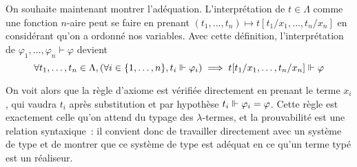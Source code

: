 \documentclass{article}
\begin{document}
On souhaite maintenant montrer l'adéquation. L'interprétation de $t\in \Lambda$ comme une fonction $n$-aire peut se faire en prenant $(t_1,\ldots,t_n) \mapsto t[t_1/x_1,\ldots,t_n/x_n]$ en considérant qu'on a ordonné nos variables. Avec cette définition, l'interprétation de $\varphi_1,\ldots,\varphi_n\vdash \varphi$ devient
\[\forall t_1,\ldots,t_n \in \Lambda, (\forall i \in \{1,\ldots,n\}, t_i \Vdash \varphi_i)\implies t[t_1/x_1,\ldots,t_n/x_n]\Vdash\varphi\]

On voit alors que la règle d'axiome est vérifiée directement en prenant le terme $x_i$, qui vaudra $t_i$ après substitution et par hypothèse $t_i\Vdash \varphi_i = \varphi$. Cette règle est exactement celle qu'on attend du typage des $\lambda$-termes, et la prouvabilité est une relation syntaxique~: il convient donc de travailler directement avec un système de type et de montrer que ce système de type est adéquat en ce qu'un terme typé est un réaliseur.
\end{document}
